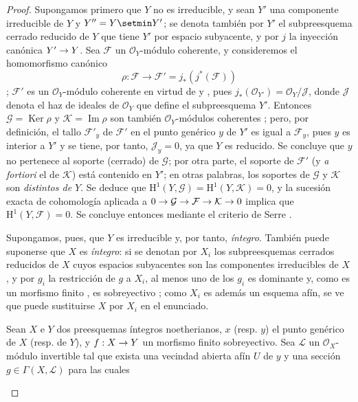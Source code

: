 \documentclass[oneside,10pt]{amsart}
\makeatletter
\newcommand{\ega@arrow}[2]{\mathchoice{#1}{#2}{#2}{#2}}
\renewcommand{\to}{\ega@arrow{\longrightarrow}{\rightarrow}}
\newcommand{\oldpage}[2][]{\marginnote{\normalfont\footnotesize\textbf{#1}~|~#2}\ignorespaces}
\let\EGAOriginalLabel\label
\renewcommand{\label}[1]{\phantomsection\EGAOriginalLabel{#1}}
\makeatother
\begin{document}
\begin{proof}
Supongamos primero que $Y$ no es irreducible, y sean $Y'$ una componente irreducible de $Y$ y $Y''=Y\setmin Y'$;
se denota también por $Y'$ el subpreesquema cerrado reducido de $Y$ que tiene $Y'$ por espacio subyacente, y por $j$ la inyección canónica $Y'\to Y$.
Sea $\mathcal{F}$ un $\mathcal{O}_Y$-módulo coherente, y consideremos el homomorfismo canónico
\[
\rho:\mathcal{F}\longrightarrow
\mathcal{F}'=j_*(j^*(\mathcal{F}))
\]
;
$\mathcal{F}'$ es un $\mathcal{O}_Y$-módulo coherente en virtud de  y , pues
$j_*(\mathcal{O}_{Y'})=\mathcal{O}_Y/\mathcal{J}$,
donde $\mathcal{J}$ denota el haz de ideales de $\mathcal{O}_Y$ que define el subpreesquema $Y'$.
Entonces $\mathcal{G}=\operatorname{Ker}\rho$ y $\mathcal{K}=\operatorname{Im}\rho$ son también $\mathcal{O}_Y$-módulos coherentes ;
pero, por definición, el tallo $\mathcal{F}'_y$ de $\mathcal{F}'$ en el punto genérico $y$ de $Y'$ es igual a $\mathcal{F}_y$, pues $y$ es interior a $Y'$ y se tiene, por tanto, $\mathcal{J}_y=0$, ya que $Y$ es reducido.
Se concluye que $y$ no pertenece al soporte (cerrado) de $\mathcal{G}$;
por otra parte, el soporte de $\mathcal{F}'$ (y \emph{a fortiori} el de $\mathcal{K}$) está contenido en $Y'$;
en otras palabras, los soportes de $\mathcal{G}$ y $\mathcal{K}$ son \emph{distintos de $Y$}.
Se deduce que
$\mathrm{H}^1(Y,\mathcal{G})=\mathrm{H}^1(Y,\mathcal{K})=0$,
y la sucesión exacta de cohomología aplicada a
$0\to\mathcal{G}\to\mathcal{F}\to\mathcal{K}\to0$
implica que $\mathrm{H}^1(Y,\mathcal{F})=0$.
Se concluye entonces mediante el criterio de Serre .

Supongamos, pues, que $Y$ es irreducible y, por tanto, \emph{íntegro}.
También puede suponerse que $X$ es \emph{íntegro}:
si se denotan por $X_i$ los subpreesquemas cerrados reducidos de $X$ cuyos espacios subyacentes son las componentes irreducibles de $X$ , y por $g_i$ la restricción de $g$ a $X_i$, al menos uno de los $g_i$ es dominante y, como es un morfismo finito , es sobreyectivo ;
como $X_i$ es además un esquema afín, se ve que puede sustituirse $X$ por $X_i$ en el enunciado.

\begin{lemma}[6.7.1.1]
\label{II.6.7.1.1-fr}
Sean $X$ e $Y$ dos preesquemas íntegros noetherianos, $x$ \textup{(resp. $y$)} el punto genérico de $X$ \textup{(resp. de $Y$)}, y $f:X\to Y$ un morfismo finito sobreyectivo.
Sea $\mathcal{L}$ un $\mathcal{O}_X$-módulo invertible tal que exista una vecindad abierta afín $U$ de $y$ y una sección $g\in\Gamma(X,\mathcal{L})$ para las cuales
\oldpage[II]{137}


\end{lemma}
\end{proof}
\end{document}
